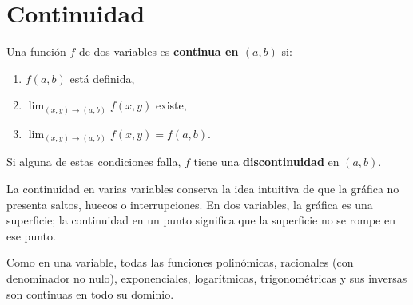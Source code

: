 \section{Continuidad}

\begin{definition}
Una función $f$ de dos variables es \textbf{continua en $(a,b)$} si:
\begin{enumerate}
    \item $f(a,b)$ está definida,
    \item $\lim_{(x,y)\to(a,b)} f(x,y)$ existe,
    \item $\lim_{(x,y)\to(a,b)} f(x,y) = f(a,b)$.
\end{enumerate}
Si alguna de estas condiciones falla, $f$ tiene una \textbf{discontinuidad}
en $(a,b)$.
\end{definition}

La continuidad en varias variables conserva la idea intuitiva de que
la gráfica no presenta saltos, huecos o interrupciones. En dos
variables, la gráfica es una superficie; la continuidad en un punto
significa que la superficie no se rompe en ese punto.

\begin{rem}
Como en una variable, todas las funciones polinómicas, racionales
(con denominador no nulo), exponenciales, logarítmicas, trigonométricas
y sus inversas son continuas en todo su dominio.
\end{rem}

